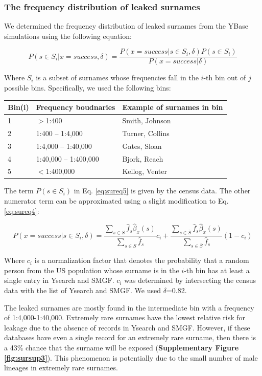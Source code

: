 \subsubsection{The frequency distribution of leaked surnames}
We determined the frequency distribution of leaked surnames from the YBase simulations using the following equation:

\begin{equation}
\label{eq:sureq5}
P(s \in S_i | x = success, \delta) = \frac
{P(x=success | s \in S_i, \delta)P(s \in S_i)}
{P(x=success | \delta)}
\end{equation}

Where $S_i$ is a subset of surnames whose frequencies fall in the $i$-th bin out of $j$ possible bins. Specifically, we used the following bins:

\begin{table}[h!]
\begin{tabular}{|l|l|l|}
\hline
Bin(i) & Frequency boudnaries & Example of surnames in bin \\
\hline
1& 	$>$1:400 &	Smith, Johnson \\
2	&1:400 – 1:4,000	& Turner, Collins\\
3	& 1:4,000 – 1:40,000 & 	Gates, Sloan\\
4	& 1:40,000 – 1:400,000 &	Bjork, Reach \\
5	& $<$1:400,000 &	Kellog, Venter \\
\hline
\end{tabular}
\end{table}

The term $P(s \in S_i)$ in Eq. \ref{eq:sureq5} is given by the census data. The other numerator term can be approximated using a slight modification to Eq. \ref{eq:sureq4}:

\begin{equation}
\label{eq:sureq6}
P(x = success | s \in S_i, \delta) = 
\frac{\sum_{s \in S} \hat{f}_s \hat{\beta}_x(s)}
{\sum_{s \in S}\hat{f}_s}c_i + 
\frac{\sum_{s \in \overline{S}} \hat{f}_s\hat{\beta}_x(s)}
{\sum_{s \in \overline{S}} \hat{f}_s} (1-c_i)
\end{equation}

Where $c_i$ is a normalization factor that denotes the probability that a random person from the US population whose surname is in the $i$-th bin has at least a single entry in Ysearch and SMGF.  $c_i$ was determined by intersecting the census data with the list of Ysearch and SMGF. We used $\delta$=0.82.

The leaked surnames are mostly found in the intermediate bin with a frequency of 1:4,000-1:40,000. Extremely rare surnames have the lowest relative risk for leakage due to the absence of records in Ysearch and SMGF. However, if these databases have even a single record for an extremely rare surname, then there is a 43\% chance that the surname will be exposed (\textbf{Supplementary Figure \ref{fig:sursup3}}). This phenomenon is potentially due to the small number of male lineages in extremely rare surnames.	

